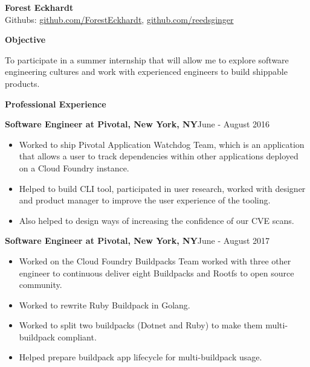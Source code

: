 \documentclass[10pt,a4papaer]{article}
\begin{document}
	{\selectfont
		
		\begin{center}	
			{\huge\textbf{Forest Eckhardt}} \\
			Githubs:
			\href{http://www.github.com/ForestEckhardt}{github.com/ForestEckhardt}, \href{http://www.github.com/reedsginger}{github.com/reedsginger}  \\
		\end{center}
		
		{\noindent\textbf{Objective}}\vspace*{-20px}\\
		
		\noindent\makebox[\linewidth]{\rule{\textwidth}{1.2pt}}
		
		\setlength{\leftskip}{15pt}
		
		{\noindent To participate in a summer internship that will allow me to explore software engineering cultures and work with experienced engineers to build shippable products.}\\
		
		\setlength{\leftskip}{0pt}
		
		{\noindent\textbf{Professional Experience}}\vspace*{-20px}\\
		
		\noindent\makebox[\linewidth]{\rule{\textwidth}{1.2pt}}
		
		\setlength{\leftskip}{15pt}
		
		{\noindent\textbf{Software Engineer at Pivotal, New York, NY}}{\hfill June - August 2016}
		
		\begin{itemize}[noitemsep, topsep=0pt]
			\item Worked to ship Pivotal Application Watchdog Team, which is an application that allows a user to track dependencies within other applications deployed on a Cloud Foundry instance. 
			\item Helped to build CLI tool, participated in user research, worked with designer and product manager to improve the user experience of the tooling. \item Also helped to design ways of increasing the confidence of our CVE scans.\\
		\end{itemize}
		
		{\noindent\textbf{Software Engineer at Pivotal, New York, NY}}{\hfill June - August 2017}
		\begin{itemize}[noitemsep, topsep=0pt]
			\item Worked on the Cloud Foundry Buildpacks Team worked with three other engineer to continuous deliver eight Buildpacks and Rootfs to open source community. 
			\item Worked to rewrite Ruby Buildpack in Golang.
			\item Worked to split two buildpacks (Dotnet and Ruby) to make them multi-buildpack compliant.
			\item Helped prepare buildpack app lifecycle for multi-buildpack usage.\\
			

\end{itemize}}
\end{document}
